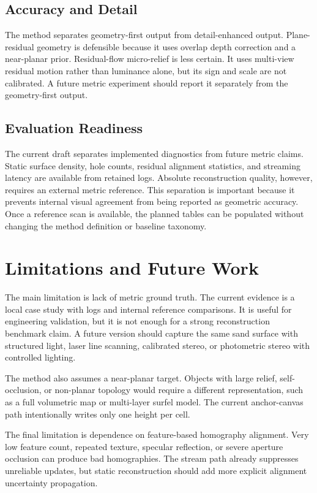 \documentclass[conference]{IEEEtran}
\begin{document}
\subsection{Accuracy and Detail}
The method separates geometry-first output from detail-enhanced output. Plane-residual geometry is defensible because it uses overlap depth correction and a near-planar prior. Residual-flow micro-relief is less certain. It uses multi-view residual motion rather than luminance alone, but its sign and scale are not calibrated. A future metric experiment should report it separately from the geometry-first output.

\subsection{Evaluation Readiness}
The current draft separates implemented diagnostics from future metric claims. Static surface density, hole counts, residual alignment statistics, and streaming latency are available from retained logs. Absolute reconstruction quality, however, requires an external metric reference. This separation is important because it prevents internal visual agreement from being reported as geometric accuracy. Once a reference scan is available, the planned tables can be populated without changing the method definition or baseline taxonomy.

\section{Limitations and Future Work}
The main limitation is lack of metric ground truth. The current evidence is a local case study with logs and internal reference comparisons. It is useful for engineering validation, but it is not enough for a strong reconstruction benchmark claim. A future version should capture the same sand surface with structured light, laser line scanning, calibrated stereo, or photometric stereo with controlled lighting.

The method also assumes a near-planar target. Objects with large relief, self-occlusion, or non-planar topology would require a different representation, such as a full volumetric map or multi-layer surfel model. The current anchor-canvas path intentionally writes only one height per cell.

The final limitation is dependence on feature-based homography alignment. Very low feature count, repeated texture, specular reflection, or severe aperture occlusion can produce bad homographies. The stream path already suppresses unreliable updates, but static reconstruction should add more explicit alignment uncertainty propagation.
\end{document}
